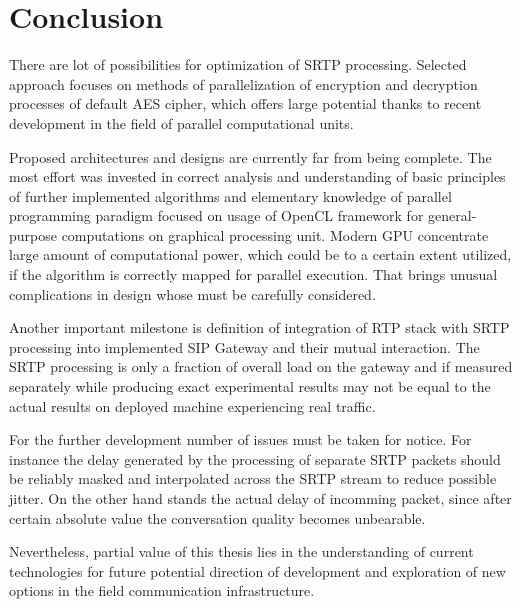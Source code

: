  












\chapter{Conclusion}\label{chapter:conclusion}
There are lot of possibilities for optimization of SRTP processing. Selected
approach focuses on methods of parallelization of encryption and decryption
processes of default AES cipher, which offers large potential thanks to recent
development in the field of parallel computational units.

Proposed architectures and designs are currently far from being complete. The 
most effort was invested in correct analysis and understanding of basic 
principles of further implemented algorithms and elementary knowledge of 
parallel programming paradigm focused on usage of OpenCL framework for
general-purpose computations on graphical processing unit. Modern GPU 
concentrate large amount of computational power, which could be to a certain
extent utilized, if the algorithm is correctly mapped for parallel execution.
That brings unusual complications in design whose must be carefully considered.

Another important milestone is definition of integration of RTP stack with SRTP 
processing into implemented SIP Gateway and their mutual interaction. The SRTP 
processing is only a fraction of overall load on the gateway and if measured 
separately while producing exact experimental results may not be equal to the 
actual results on deployed machine experiencing real traffic. 

For the further development number of issues must be taken for notice. For 
instance the delay generated by the processing of separate SRTP packets should 
be reliably masked and interpolated across the SRTP stream to reduce possible 
jitter. On the other hand stands the actual delay of incomming packet, since
after certain absolute value the conversation quality becomes unbearable.

Nevertheless, partial value of this thesis lies in the understanding of current
technologies for future potential direction of development and exploration of
new options in the field communication infrastructure.



